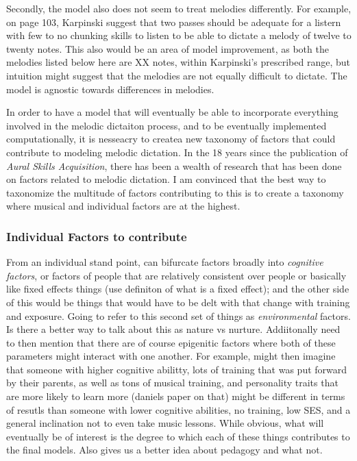 \documentclass[]{book}
\theoremstyle{definition}
\theoremstyle{definition}
\theoremstyle{definition}
\theoremstyle{remark}
\begin{document}
Secondly, the model also does not seem to treat melodies differently.
For example, on page 103, Karpinski suggest that two passes should be
adequate for a listern with few to no chunking skills to listen to be
able to dictate a melody of twelve to twenty notes. This also would be
an area of model improvement, as both the melodies listed below here are
XX notes, within Karpinski's prescribed range, but intuition might
suggest that the melodies are not equally difficult to dictate. The
model is agnostic towards differences in melodies.

In order to have a model that will eventually be able to incorporate
everything involved in the melodic dictaiton process, and to be
eventually implemented computationally, it is nesseacry to createa new
taxonomy of factors that could contribute to modeling melodic dictation.
In the 18 years since the publication of \emph{Aural Skills
Acquisition}, there has been a wealth of research that has been done on
factors related to melodic dictation. I am convinced that the best way
to taxonomize the multitude of factors contributing to this is to create
a taxonomy where musical and individual factors are at the highest.

\hypertarget{individual-factors-to-contribute}{%
\subsubsection{Individual Factors to
contribute}\label{individual-factors-to-contribute}}

From an individual stand point, can bifurcate factors broadly into
\emph{cognitive factors}, or factors of people that are relatively
consistent over people or basically like fixed effects things (use
definiton of what is a fixed effect); and the other side of this would
be things that would have to be delt with that change with training and
exposure. Going to refer to this second set of things as
\emph{environmental} factors. Is there a better way to talk about this
as nature vs nurture. Addiitonally need to then mention that there are
of course epigenitic factors where both of these parameters might
interact with one another. For example, might then imagine that someone
with higher cognitive abilitty, lots of training that was put forward by
their parents, as well as tons of musical training, and personality
traits that are more likely to learn more (daniels paper on that) might
be different in terms of resutls than someone with lower cognitive
abilities, no training, low SES, and a general inclination not to even
take music lessons. While obvious, what will eventually be of interest
is the degree to which each of these things contributes to the final
models. Also gives us a better idea about pedagogy and what not.
\end{document}
